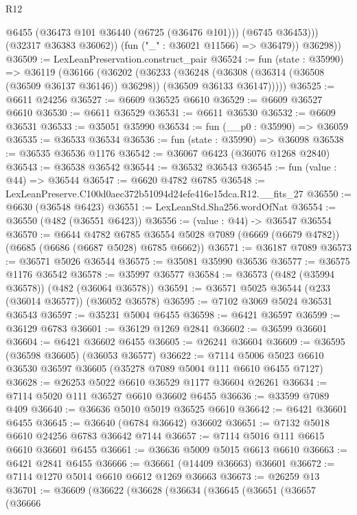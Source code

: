 \begin{lexlean}{R12}
\begin{coremodule}
                @6455
                (@36473 @101 @36440 (@6725 (@36476 @101)))
                (@6745 @36453)))
            (@32317 @36383 @36062))
          (fun ("_" : @36021 @11566) => @36479))
        @36298))
@36509 := LexLeanPreservation.construct_pair
@36524 := fun (state : @35990) =>
  @36119
    (@36166
      (@36202
        (@36233
          (@36248
            (@36308 (@36314 (@36508 (@36509 @36137 @36146)) @36298))
            (@36509 @36133 @36147)))))
@36525 := @6611 @24256
@36527 := @6609 @36525 @6610
@36529 := @6609 @36527 @6610
@36530 := @6611 @36529
@36531 := @6611 @36530
@36532 := @6609 @36531
@36533 := @35051 @35990
@36534 := fun (__p0 : @35990) => @36059
@36535 := @36533 @36534
@36536 := fun (state : @35990) => @36098
@36538 := @36535 @36536 @1176
@36542 := @36067 @6423 (@36076 @1268 @2840)
@36543 := @36538 @36542
@36544 := @36532 @36543
@36545 := fun (value : @44) => @36544
@36547 := @6620 @4782 @6785
@36548 := LexLeanPreserve.C100d0aec372b51094d24efe416e15dca.R12.__fits_27
@36550 := @6630 (@36548 @6423)
@36551 := LexLeanStd.Sha256.wordOfNat
@36554 := @36550 (@482 (@36551 @6423))
@36556 := (value : @44) -> @36547 @36554
@36570 := @6644
    @4782
    @6785
    @36554
    @5028
    @7089
    (@6669 (@6679 @4782))
    (@6685 (@6686 (@6687 @5028) @6785 @6662))
@36571 := @36187 @7089
@36573 := @36571 @5026 @36544
@36575 := @35081 @35990 @36536
@36577 := @36575 @1176 @36542
@36578 := @35997 @36577
@36584 := @36573 (@482 (@35994 @36578)) (@482 (@36064 @36578))
@36591 := @36571 @5025 @36544 (@233 (@36014 @36577)) (@36052 @36578)
@36595 := @7102 @3069 @5024 @36531 @36543
@36597 := @35231 @5004 @6455
@36598 := @6421 @36597
@36599 := @36129 @6783
@36601 := @36129 @1269 @2841
@36602 := @36599 @36601
@36604 := @6421 @36602 @6455
@36605 := @26241 @36604
@36609 := @36595 (@36598 @36605) (@36053 @36577)
@36622 := @7114 @5006 @5023 @6610 @36530 @36597 @36605 (@35278 @7089 @5004 @111 @6610 @6455 @7127)
@36628 := @26253 @5022 @6610 @36529 @1177 @36604 @26261
@36634 := @7114 @5020 @111 @36527 @6610 @36602 @6455
@36636 := @33599 @7089 @409
@36640 := @36636 @5010 @5019 @36525 @6610
@36642 := @6421 @36601 @6455
@36645 := @36640 (@6784 @36642) @36602
@36651 := @7132 @5018 @6610 @24256 @6783 @36642 @7144
@36657 := @7114 @5016 @111 @6615 @6610 @36601 @6455
@36661 := @36636 @5009 @5015 @6613 @6610
@36663 := @6421 @2841 @6455
@36666 := @36661 (@14409 @36663) @36601
@36672 := @7114 @1270 @5014 @6610 @6612 @1269 @36663
@36673 := @26259 @13
@36701 := @36609
    (@36622
      (@36628
        (@36634
          (@36645
            (@36651
              (@36657
                (@36666

\end{coremodule}
\end{lexlean}
